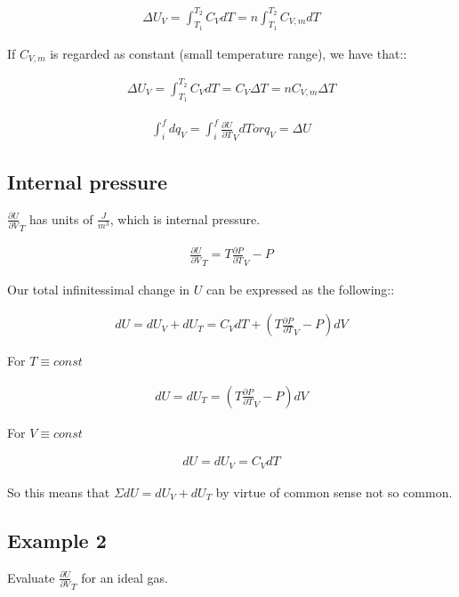 \documentclass[12pt]{book}
\begin{document}
\begin{align*}
    \Delta U_V=\int_{T_1}^{T_2}C_V dT=n\int_{T_1}^{T_2}C_{V,m}dT
\end{align*}

If $C_{V,m}$ is regarded as constant (small temperature range), we have that::

\begin{align*}
    \Delta U_V=\int_{T_1}^{T_2}C_V dT=C_V\Delta T=nC_{V,m}\Delta T
\end{align*}

\begin{align*}
    \int_{i}^{f}dq_V=\int_{i}^{f}\frac{\partial U}{\partial T}_V dT or q_V=\Delta U
\end{align*}

\subsection*{Internal pressure}

$\frac{\partial U}{\partial V}_T$ has units of $\frac{J}{m^3}$, which is internal pressure.

\begin{align*}
    \frac{\partial U}{\partial V}_T=T\frac{\partial P}{\partial T}_V-P
\end{align*}

Our total infinitessimal change in $U$ can be expressed as the following::

\begin{align*}
    dU=dU_V+dU_T=C_V dT+\left(T\frac{\partial P}{\partial T}_V-P\right) dV
\end{align*}

For $T\equiv const$

\begin{align*}
    dU=dU_T=\left(T\frac{\partial P}{\partial T}_V-P\right)dV
\end{align*}

For $V\equiv const$

\begin{align*}
    dU=dU_V=C_V dT
\end{align*}

So this means that $\Sigma dU=dU_V+dU_T$ by virtue of common sense not so common.

\subsection*{Example 2}

Evaluate $\frac{\partial U}{\partial V}_T$ for an ideal gas.
\end{document}
